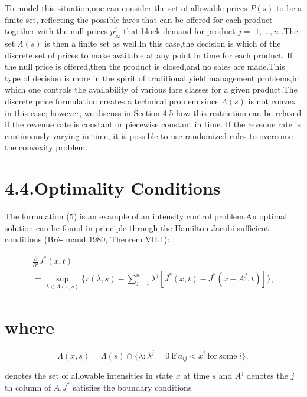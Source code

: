 To model this situation,one can consider the set of allowable prices
\(P ( s )\) to be a finite set, reflecting the possible fares that can
be offered for each product together with the null prices
\(p _ { \infty } ^ { j }\) that block demand for product \(j =\)
\(1 , \ldots , n\) .The set \(\Lambda ( s )\) is then a finite set as
well.In this case,the decision is which of the discrete set of prices to
make available at any point in time for each product. If the null price
is offered,then the product is closed,and no sales are made.This type of
decision is more in the spirit of traditional yield management
problems,in which one controls the availability of various fare classes
for a given product.The discrete price formulation creates a technical
problem since \(\Lambda ( s )\) is not convex in this case; however, we
discuss in Section 4.5 how this restriction can be relaxed if the
revenue rate is constant or piecewise constant in time. If the revenue
rate is continuously varying in time, it is possible to use randomized
rules to overcome the convexity problem.

\section{4.4.Optimality Conditions}\label{optimality-conditions}

The formulation (5) is an example of an intensity control problem.An
optimal solution can be found in principle through the Hamilton-Jacobi
sufficient conditions (Bré- maud 1980, Theorem VII.1):

\[
\begin{array} { l } { \displaystyle \frac { \partial } { \partial t } J ^ { * } ( x , t ) } \\ { = \displaystyle \operatorname* { s u p } _ { \lambda \in \Lambda ( x , s ) } \bigg \{ r ( \lambda , s ) - \sum _ { j = 1 } ^ { n } \lambda ^ { j } [ J ^ { * } ( x , t ) - J ^ { * } ( x - A ^ { j } , t ) ] \bigg \} , } \end{array}
\]

\section{where}\label{where}

\[
\Lambda ( x , s ) = \Lambda ( s ) \cap \{ \lambda \colon \lambda ^ { j } = 0 { \mathrm { ~ i f ~ } } a _ { i j } < x ^ { i } { \mathrm { ~ f o r ~ s o m e ~ } } i \} ,
\]

denotes the set of allowable intensities in state \(x\) at time \(s\)
and \(A ^ { j }\) denotes the \(j\) th column of \(A . J ^ { * }\)
satisfies the boundary conditions

